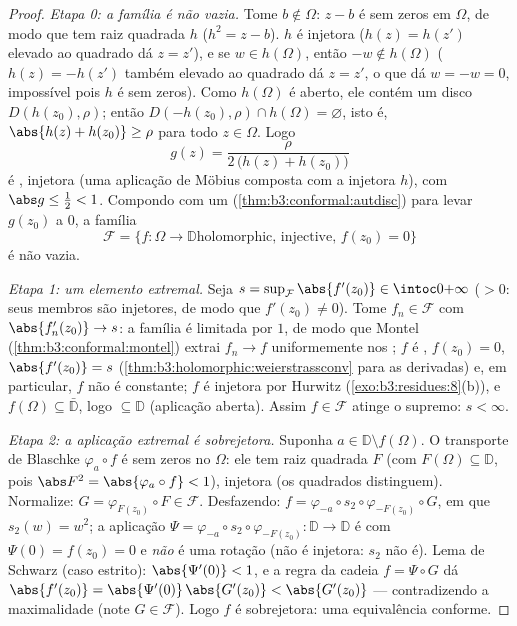 \begin{proof}
\emph{Etapa 0: a família é não vazia.} Tome $b \notin \Omega$: $z - b$ é sem
zeros em $\Omega$, de modo que tem raiz quadrada  $h$
($h^2 = z - b$). $h$ é injetora ($h(z) =
h(z')$ elevado ao quadrado dá $z = z'$),
e se $w \in h(\Omega)$, então $-w
\notin h(\Omega)$ ($h(z) = -h(z')$ também elevado ao quadrado dá
$z = z'$, o que dá $w = -w = 0$, impossível pois $h$ é sem zeros). Como
$h(\Omega)$ é aberto, ele contém um disco $D(h(z_0), \rho)$; então $D(-h(z_0), \rho) \cap h(\Omega) = \varnothing$, isto é, $\abs{h(z) + h(z_0)} \geq \rho$
para todo $z \in \Omega$. Logo
\[
g(z) = \frac{\rho}{2\,\bigl(h(z) + h(z_0)\bigr)}
\]
é , injetora (uma aplicação de Möbius composta com a injetora
$h$), com $\abs g \leq \frac12 < 1$. Compondo com um 
(\cref{thm:b3:conformal:autdisc}) para levar $g(z_0)$ a $0$, a família
\[
\mathcal F = \{f \colon \Omega \to \mathbb D \text{
holomorphic, injective, } f(z_0) = 0\}
\]
é não vazia.

\emph{Etapa 1: um elemento extremal.} Seja $s =
\sup_{\mathcal F}\abs{f'(z_0)} \in \intoc0{+\infty}$ ($> 0$: seus membros
são injetores, de modo que $f'(z_0) \neq 0$). Tome $f_n \in
\mathcal F$ com $\abs{f_n'(z_0)} \to s$: a família é
limitada por $1$, de modo que Montel (\cref{thm:b3:conformal:montel}) extrai $f_n \to f$
uniformemente nos ; $f$ é , $f(z_0) = 0$, $\abs{f'(z_0)} = s$
(\cref{thm:b3:holomorphic:weierstrassconv} para as derivadas) e, em particular, $f$ não é
constante; $f$ é injetora por Hurwitz (\cref{exo:b3:residues:8}(b)), e $f(\Omega) \subseteq \bar{\mathbb D}$,
logo $\subseteq
\mathbb D$ (aplicação aberta). Assim $f \in \mathcal F$ atinge o supremo: $s < \infty$.

\emph{Etapa 2: a aplicação extremal é sobrejetora.} Suponha $a \in
\mathbb D\setminus f(\Omega)$. O
transporte de Blaschke $\varphi_a\circ f$ é sem zeros no 
$\Omega$: ele tem raiz quadrada  $F$ (com $F(\Omega) \subseteq \mathbb D$, pois
$\abs F^2 =
\abs{\varphi_a\circ f} < 1$), injetora (os quadrados distinguem). Normalize: $G = \varphi_{F(z_0)}\circ F \in
\mathcal F$.
Desfazendo: $f = \varphi_{-a}\circ s_2 \circ
\varphi_{-F(z_0)}\circ G$, em que $s_2(w) = w^2$; a aplicação $\Psi
= \varphi_{-a}\circ s_2\circ\varphi_{-F(z_0)} \colon \mathbb D
\to \mathbb D$ é  com $\Psi(0) = f(z_0) = 0$
e \emph{não} é uma rotação (não é injetora: $s_2$ não é). Lema de
Schwarz (caso estrito): $\abs{\Psi'(0)} < 1$, e a regra da cadeia $f = \Psi\circ G$ dá $\abs{f'(z_0)} =
\abs{\Psi'(0)}\,\abs{G'(z_0)} < \abs{G'(z_0)}$ ---
contradizendo a maximalidade (note $G \in \mathcal F$). Logo $f$ é sobrejetora:
uma equivalência conforme.


\end{proof}
